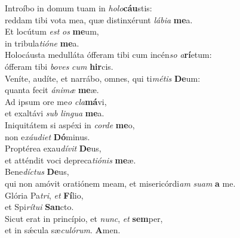 \evenverse Introíbo in domum tuam in \textit{ho}\textit{lo}\textbf{cáu}stis:~\*\\
\evenverse reddam tibi vota mea, quæ distinxérunt \textit{lá}\textit{bi}\textit{a} \textbf{me}a.\\
\oddverse Et locútum \textit{est} \textit{os} \textbf{me}um,~\*\\
\oddverse in tribula\textit{ti}\textit{ó}\textit{ne} \textbf{me}a.\\
\evenverse Holocáusta medulláta ófferam tibi cum incén\textit{so} \textit{a}\textbf{rí}etum:~\*\\
\evenverse ófferam tibi \textit{bo}\textit{ves} \textit{cum} \textbf{hir}cis.\\
\oddverse Veníte, audíte, et narrábo, omnes, qui ti\textit{mé}\textit{tis} \textbf{De}um:~\*\\
\oddverse quanta fecit \textit{á}\textit{ni}\textit{mæ} \textbf{me}æ.\\
\evenverse Ad ipsum ore me\textit{o} \textit{cla}\textbf{má}vi,~\*\\
\evenverse et exaltávi \textit{sub} \textit{lin}\textit{gua} \textbf{me}a.\\
\oddverse Iniquitátem si aspéxi in \textit{cor}\textit{de} \textbf{me}o,~\*\\
\oddverse non e\textit{xáu}\textit{di}\textit{et} \textbf{Dó}minus.\\
\evenverse Proptérea exau\textit{dí}\textit{vit} \textbf{De}us,~\*\\
\evenverse et atténdit voci depreca\textit{ti}\textit{ó}\textit{nis} \textbf{me}æ.\\
\oddverse Bene\textit{dí}\textit{ctus} \textbf{De}us,~\*\\
\oddverse qui non amóvit oratiónem meam, et misericórdi\textit{am} \textit{su}\textit{am} \textbf{a} me.\\
\evenverse Glória Pa\textit{tri}, \textit{et} \textbf{Fí}lio,~\*\\
\evenverse et Spi\textit{rí}\textit{tu}\textit{i} \textbf{San}cto.\\
\oddverse Sicut erat in princípio, et \textit{nunc}, \textit{et} \textbf{sem}per,~\*\\
\oddverse et in sǽcula sæ\textit{cu}\textit{ló}\textit{rum}. \textbf{A}men.\\
